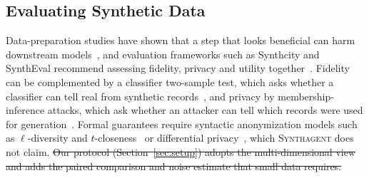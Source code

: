 \documentclass[conference]{IEEEtran}
\newcommand{\system}{\textsc{Synthagent}\xspace}
\providecommand{\DIFdeltex}[1]{{\protect\color{red}\sout{#1}}}                      %
\providecommand{\DIFdelbegin}{} %
\providecommand{\DIFdel}[1]{\texorpdfstring{\DIFdeltex{#1}}{}} %
\newcommand{\DIFscaledelfig}{0.5}
\newlength{\DIFdelgraphicswidth} %
\newlength{\DIFdelgraphicsheight} %
\newcommand{\DIFdelincludegraphics}[2][]{%
\sbox{\DIFdelgraphicsbox}{\DIFOincludegraphics[#1]{#2}}%
\settoboxwidth{\DIFdelgraphicswidth}{\DIFdelgraphicsbox} %
\settoboxtotalheight{\DIFdelgraphicsheight}{\DIFdelgraphicsbox} %
\scalebox{\DIFscaledelfig}{%
\parbox[b]{\DIFdelgraphicswidth}{\usebox{\DIFdelgraphicsbox}\\[-\baselineskip] \rule{\DIFdelgraphicswidth}{0em}}\llap{\resizebox{\DIFdelgraphicswidth}{\DIFdelgraphicsheight}{%
\setlength{\unitlength}{\DIFdelgraphicswidth}%
\begin{picture}(1,1)%
\thicklines\linethickness{2pt} %
{\color[rgb]{1,0,0}\put(0,0){\framebox(1,1){}}}%
{\color[rgb]{1,0,0}\put(0,0){\line( 1,1){1}}}%
{\color[rgb]{1,0,0}\put(0,1){\line(1,-1){1}}}%
\end{picture}%
}\hspace*{3pt}}} %
} %
\DeclareRobustCommand{\DIFdelbegin}{\DIFOdelbegin \let\includegraphics\DIFdelincludegraphics} %
\begin{document}
\subsection{Evaluating Synthetic Data}
Data-preparation studies have shown that a step that looks beneficial can harm downstream models~\cite{li2021cleanml,guha2023cleaningfairness}, and evaluation frameworks such as Synthcity and SynthEval recommend assessing fidelity, privacy and utility together~\cite{qian2023synthcity,lautrup2025syntheval}. Fidelity can be complemented by a classifier two-sample test, which asks whether a classifier can tell real from synthetic records~\cite{lopezpaz2017c2st}, and privacy by membership-inference attacks, which ask whether an attacker can tell which records were used for generation~\cite{shokri2017mia,hyeong2022tabularmia}. Formal guarantees require syntactic anonymization models such as $\ell$-diversity and $t$-closeness~\cite{machanavajjhala2006ldiversity,li2007tcloseness} or differential privacy~\cite{dwork2014dp}, which \system does not claim.
\DIFdelbegin \DIFdel{Our protocol (Section~\ref{sec:setup}) adopts the multi-dimensional view and adds the paired comparison and noise estimate that small data requires.
}%

\end{document}

